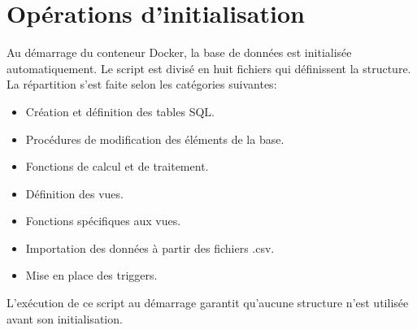 \section{Opérations d'initialisation}

Au démarrage du conteneur Docker, la base de données est initialisée
automatiquement. Le script est divisé en huit fichiers qui définissent la
structure. La répartition s'est faite selon les catégories suivantes:

\begin{itemize}
   \item Création et définition des tables SQL.
   \item Procédures de modification des éléments de la base.
   \item Fonctions de calcul et de traitement.
   \item Définition des vues.
   \item Fonctions spécifiques aux vues.
   \item Importation des données à partir des fichiers .csv.
   \item Mise en place des triggers.
\end{itemize}
L'exécution de ce script au démarrage garantit qu'aucune structure n'est
utilisée avant son initialisation.
